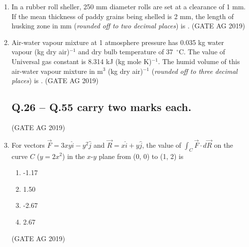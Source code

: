 \documentclass[journal,12pt,onecolumn]{IEEEtran}
\theoremstyle{remark}
\begin{document}
\begin{enumerate}
\item 
In a rubber roll sheller, 250 mm diameter rolls are set at a clearance of 1 mm. If the mean thickness of paddy grains being shelled is 2 mm, the length of husking zone in mm (\textit{rounded off to two decimal places}) is \underline{\hspace{2cm}}.
\hfill{(GATE AG 2019)}

\item 
Air-water vapour mixture at 1 atmosphere pressure has 0.035 kg water vapour (kg dry air)$^{-1}$ and dry bulb temperature of 37~$^\circ$C. The value of Universal gas constant is 8.314 kJ (kg mole K)$^{-1}$. The humid volume of this air-water vapour mixture in m$^3$ (kg dry air)$^{-1}$ (\textit{rounded off to three decimal places}) is \underline{\hspace{2cm}}.
\hfill{(GATE AG 2019)}

\subsection{Q.26 -- Q.55 carry two marks each.}


\hfill{(GATE AG 2019)}

\item For vectors $\vec{F} = 3xy\hat{i} - y^2\hat{j}$ and $\vec{R} = x\hat{i} + y\hat{j}$, the value of  
$\displaystyle \int_C \vec{F} \cdot d\vec{R}$ on the curve $C$ ($y = 2x^2$) in the $x$-$y$ plane from (0, 0) to (1, 2) is  
\begin{multicols}{4}
\begin{enumerate}
\item -1.17
\item 1.50
\item -2.67
\item 2.67
\end{enumerate}
\end{multicols}
\hfill{(GATE AG 2019)}


\end{enumerate}
\end{document}
